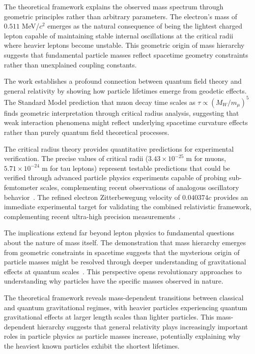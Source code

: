 \documentclass[%
 reprint,
 amsmath,amssymb,
 aps,
]{revtex4-1}
\numberwithin{equation}{section}%
\begin{document}
The theoretical framework  explains the observed mass spectrum through geometric principles rather than arbitrary parameters. The electron's mass of $0.511$ MeV/$c^{2}$ emerges as the natural consequence of being the lightest charged lepton capable of maintaining stable internal oscillations at the critical radii where heavier leptons become unstable. This geometric origin of mass hierarchy suggests that fundamental particle masses reflect spacetime geometry constraints rather than unexplained coupling constants.

The work establishes a profound connection between quantum field theory and general relativity by showing how particle lifetimes emerge from geodetic effects. The Standard Model prediction that muon decay time scales as $\tau \propto (M_W/m_{\mu})^5$ finds geometric interpretation through critical radius analysis, suggesting that weak interaction phenomena might reflect underlying spacetime curvature effects rather than purely quantum field theoretical processes.

The critical radius theory provides quantitative predictions for experimental verification. The precise values of critical radii ($3.43 \times 10^{-25}$ m for muons, $5.71 \times 10^{-24}$ m for tau leptons) represent testable predictions that could be verified through advanced particle physics experiments capable of probing sub-femtometer scales, complementing recent observations of analogous oscillatory behavior~\cite{walker2013}. The refined electron Zitterbewegung velocity of $0.040374c$ provides an immediate experimental target for validating the combined relativistic framework, complementing recent ultra-high precision measurements~\cite{fan2023}.

The implications extend far beyond lepton physics to fundamental questions about the nature of mass itself. The demonstration that mass hierarchy emerges from geometric constraints in spacetime suggests that the mysterious origin of particle masses might be resolved through deeper understanding of gravitational effects at quantum scales~\cite{nash1983}. This perspective opens revolutionary approaches to understanding why particles have the specific masses observed in nature.

The theoretical framework reveals mass-dependent transitions between classical and quantum gravitational regimes, with heavier particles experiencing quantum gravitational effects at larger length scales than lighter particles. This mass-dependent hierarchy suggests that general relativity plays increasingly important roles in particle physics as particle masses increase, potentially explaining why the heaviest known particles exhibit the shortest lifetimes.
\end{document}
